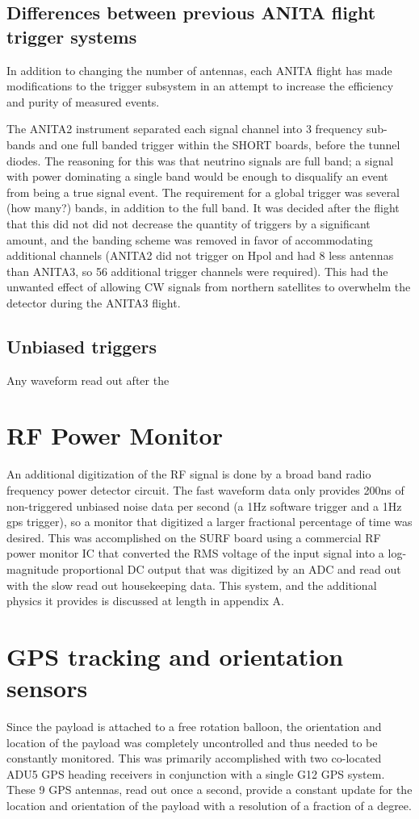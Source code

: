 	\subsection{Differences between previous ANITA flight trigger systems}
		In addition to changing the number of antennas, each ANITA flight has made modifications to the trigger subsystem in an attempt to increase the efficiency and purity of measured events.
		
		The ANITA2 instrument separated each signal channel into 3 frequency sub-bands and one full banded trigger within the SHORT boards, before the tunnel diodes.  The reasoning for this was that neutrino signals are full band; a signal with power dominating a single band would be enough to disqualify an event from being a true signal event.  The requirement for a global trigger was several (how many?) bands, in addition to the full band.  It was decided after the flight that this did not did not decrease the quantity of triggers by a significant amount, and the banding scheme was removed in favor of accommodating additional channels (ANITA2 did not trigger on Hpol and had 8 less antennas than ANITA3, so 56 additional trigger channels were required).  This had the unwanted effect of allowing CW signals from northern satellites to overwhelm the detector during the ANITA3 flight.
		
	\subsection{Unbiased triggers}
		Any waveform read out after the 
		
\section{RF Power Monitor}
	An additional digitization of the RF signal is done by a broad band radio frequency power detector circuit.  The fast waveform data only provides 200ns of non-triggered unbiased noise data per second (a 1Hz software trigger and a 1Hz gps trigger), so a monitor that digitized a larger fractional percentage of time was desired.  This was accomplished on the SURF board using a commercial RF power monitor IC that converted the RMS voltage of the input signal into a log-magnitude proportional DC output that was digitized by an ADC and read out with the slow read out housekeeping data.  This system, and the additional physics it provides is discussed at length in appendix A.

	
\section{GPS tracking and orientation sensors}
	Since the payload is attached to a free rotation balloon, the orientation and location of the payload was completely uncontrolled and thus needed to be constantly monitored.  This was primarily accomplished with two co-located ADU5 GPS heading receivers in conjunction with a single G12 GPS system.  These 9 GPS antennas, read out once a second, provide a constant update for the location and orientation of the payload with a resolution of a fraction of a degree.
